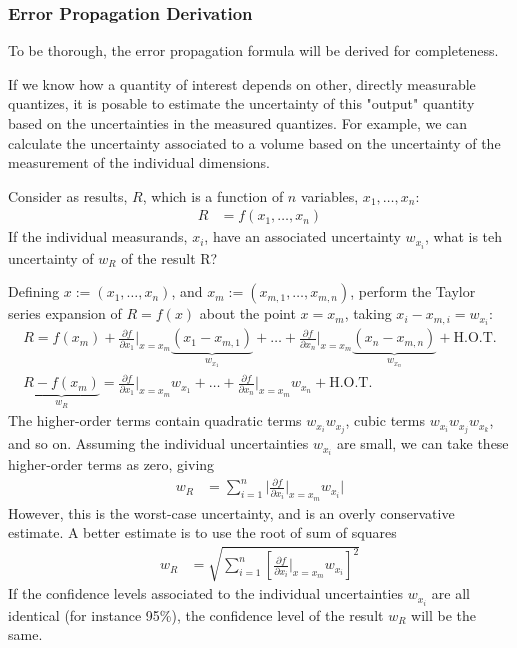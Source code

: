 \subsubsection{Error Propagation Derivation}
\label{sec:error_propagation_derivation}
To be thorough, the error propagation formula will be derived for completeness. 

If we know how a quantity of interest depends on other, directly measurable quantizes, it is posable to estimate the uncertainty of this "output" quantity based on the uncertainties in the measured quantizes. For example, we can calculate the uncertainty associated to a volume based on the uncertainty of the measurement of the individual dimensions.

Consider as results, $R$, which is a function of $n$ variables, $x_1, \ldots, x_n$:
\begin{align*}
    R &= f(x_1, \ldots, x_n)
\end{align*}
If the individual measurands, $x_i$, have an associated uncertainty $w_{x_i}$, what is teh uncertainty of $w_R$ of the result R?

Defining $x:= (x_1, \ldots, x_n)$, and $x_m := (x_{m, 1}, \ldots, x_{m, n})$, perform the Taylor series expansion of $R= f(x)$ about the point $x = x_m$, taking $x_i - x_{m, i} = w_{x_i}$:
\begin{gather*}
    R = f(x_m) + \frac{\partial f}{\partial x_1} \bigg|_{x = x_m} \underbrace{(x_1 - x_{m, 1})}_{w_{x_1}} + \ldots + \frac{\partial f}{\partial x_n} \bigg|_{x = x_m} \underbrace{(x_n - x_{m, n})}_{w_{x_n}} + \text{H.O.T.} \\
    \underbrace{R - f(x_m)}_{w_R} = \frac{\partial f}{\partial x_1} \bigg|_{x = x_m} w_{x_1} + \ldots + \frac{\partial f}{\partial x_n} \bigg|_{x = x_m} w_{x_n} + \text{H.O.T.}
\end{gather*}
The higher-order terms contain quadratic terms $w_{x_i}w_{x_j}$, cubic terms $w_{x_i}w_{x_j}w_{x_k}$, and so on. Assuming the individual uncertainties $w_{x_i}$ are small,  we can take these higher-order terms as zero, giving 
\begin{align*}
    w_R &= \sum_{i=1}^n \bigg|\frac{\partial f}{\partial x_i} \bigg|_{x = x_m} w_{x_i} \bigg|
\end{align*}
However, this is the worst-case uncertainty, and is an overly conservative estimate. A better estimate is to use the root of sum of squares
\begin{align}
    w_R &= \sqrt{\sum_{i=1}^n \left[\frac{\partial f}{\partial x_i} \bigg|_{x = x_m} w_{x_i}\right]^2} \label{eq:error_propagation}
\end{align}
If the confidence levels associated to the individual uncertainties $w_{x_i}$ are all identical (for instance 95\%), the confidence level of the result $w_R$ will be the same. 

